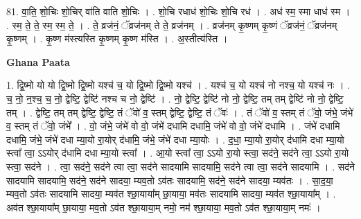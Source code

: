\documentclass[17pt]{extarticle}
\begin{document}
81. वा॒ति॒ शो॒चिः शो॒चिर् वा॑ति वाति शो॒चिः । . शो॒चि रधाध॑ शो॒चिः शो॒चि रध॑ । . अध॑ स्म॒ स्मा धाध॑ स्म । . स्म॒ ते॒ ते॒ स्म॒ स्म॒ ते॒ । . ते॒ व्रज॑नं॒ ॅव्रज॑नम् ते ते॒ व्रज॑नम् । . व्रज॑नम् कृ॒ष्णम् कृ॒ष्णं ॅव्रज॑नं॒ ॅव्रज॑नम् कृ॒ष्णम् । . कृ॒ष्ण म॑स्त्यस्ति कृ॒ष्णम् कृ॒ष्ण म॑स्ति । . अ॒स्तीत्य॑स्ति । \newline

\textbf{Ghana Paata } \newline

1. द्वि॒ष्मो यो यो द्वि॒ष्मो द्वि॒ष्मो यश्च॑ च॒ यो द्वि॒ष्मो द्वि॒ष्मो यश्च॑ । . यश्च॑ च॒ यो यश्च॑ नो नश्च॒ यो यश्च॑ नः । . च॒ नो॒ न॒श्च॒ च॒ नो॒ द्वेष्टि॒ द्वेष्टि॑ नश्च च नो॒ द्वेष्टि॑ । . नो॒ द्वेष्टि॒ द्वेष्टि॑ नो नो॒ द्वेष्टि॒ तम् तम् द्वेष्टि॑ नो नो॒ द्वेष्टि॒ तम् । . द्वेष्टि॒ तम् तम् द्वेष्टि॒ द्वेष्टि॒ तं ॅवो॑ व॒ स्तम् द्वेष्टि॒ द्वेष्टि॒ तं ॅवः॑ । . तं ॅवो॑ व॒ स्तम् तं ॅवो॒ जंभे॒ जंभे॑ व॒ स्तम् तं ॅवो॒ जंभे᳚ । . वो॒ जंभे॒ जंभे॑ वो वो॒ जंभे॑ दधामि दधामि॒ जंभे॑ वो वो॒ जंभे॑ दधामि । . जंभे॑ दधामि दधामि॒ जंभे॒ जंभे॑ दधा म्या॒यो रा॒योर् द॑धामि॒ जंभे॒ जंभे॑ दधा म्या॒योः । . द॒धा॒ म्या॒यो रा॒योर् द॑धामि दधा म्या॒यो स्त्वा᳚ त्वा॒ ऽऽयोर् द॑धामि दधा म्या॒यो स्त्वा᳚ । . आ॒यो स्त्वा᳚ त्वा॒ ऽऽयो रा॒यो स्त्वा॒ सद॑ने॒ सद॑ने त्वा॒ ऽऽयो रा॒यो स्त्वा॒ सद॑ने । . त्वा॒ सद॑ने॒ सद॑ने त्वा त्वा॒ सद॑ने सादयामि सादयामि॒ सद॑ने त्वा त्वा॒ सद॑ने सादयामि । . सद॑ने सादयामि सादयामि॒ सद॑ने॒ सद॑ने सादया॒ म्यव॒तो ऽव॑तः सादयामि॒ सद॑ने॒ सद॑ने सादया॒ म्यव॑तः । . सा॒द॒या॒ म्यव॒तो ऽव॑तः सादयामि सादया॒ म्यव॑त श्छा॒याया᳚म् छा॒याया॒ मव॑तः सादयामि सादया॒ म्यव॑त श्छा॒याया᳚म् । . अव॑त श्छा॒याया᳚म् छा॒याया॒ मव॒तो ऽव॑त श्छा॒याया॒म् नमो॒ नम॑ श्छा॒याया॒ मव॒तो ऽव॑त श्छा॒याया॒म् नमः॑ । \newline
\end{document}
